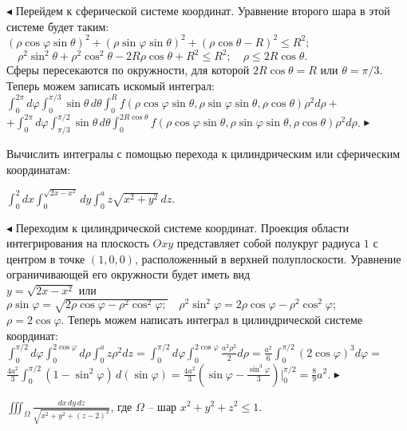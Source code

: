 \documentclass[a5paper,10pt]{article}
\begin{document}
\smallskip
\noindent $\blacktriangleleft$ Перейдем к сферической системе координат. Уравнение второго шара в этой системе будет таким:
$(\rho\cos\varphi\sin\theta)^2+(\rho\sin\varphi\sin\theta)^2+(\rho\cos\theta-R)^2\le R^2;$\\
$\quad\rho^2\sin^2\theta+\rho^2\cos^2\theta-2R\rho\cos\theta+R^2\le R^2;\quad
\rho\le2R\cos\theta.$\\
Сферы пересекаются по окружности, для которой $2R\cos\theta=R$ или $\theta=\pi/3$.\\
Теперь можем записать искомый интеграл:\\
$\displaystyle\int_0^{2\pi}d\varphi\int_0^{\pi/3}\sin\theta\,d\theta\int_0^Rf(\rho\cos\varphi\sin\theta,
\rho\sin\varphi\sin\theta,\rho\cos\theta)\rho^2d\rho+$\\
$\displaystyle +\int_0^{2\pi}d\varphi\int_{\pi/3}^{\pi/2}\sin\theta\,d\theta
\int_0^{2R\cos\theta}f(\rho\cos\varphi\sin\theta,
\rho\sin\varphi\sin\theta,\rho\cos\theta)\rho^2d\rho$. $\blacktriangleright$ 

\medskip
\noindent Вычислить интегралы с помощью перехода к цилиндрическим или сферическим координатам:

\medskip
{} $\displaystyle\int_0^2dx\int_0^{\sqrt{2x-x^2}}dy\int_0^az\sqrt{x^2+y^2}\,dz$.

\smallskip
\noindent $\blacktriangleleft$ Переходим к цилиндрической системе координат. Проекция области
интегрирования на плоскость $Oxy$ представляет собой полукруг радиуса $1$
с центром в точке $(1,0,0)$, расположенный в верхней полуплоскости.
Уравнение ограничивающей его окружности будет иметь вид\\
$y=\sqrt{2x-x^2}$ или $\rho\sin\varphi=\sqrt{2\rho\cos\varphi-\rho^2\cos^2\varphi;}\quad
\rho^2\sin^2\varphi=2\rho\cos\varphi-\rho^2\cos^2\varphi;$\\
$\rho=2\cos\varphi$. Теперь можем написать интеграл в цилиндрической системе координат:\\
$\displaystyle\int_0^{\pi/2}d\varphi\int_0^{2\cos\varphi}d\rho\int_0^az\rho^2dz=
\int_0^{\pi/2}d\varphi\int_0^{2\cos\varphi}\frac{a^2\rho^2}{2}d\rho=
\frac{a^2}{6}\int_0^{\pi/2}(2\cos\varphi)^3d\varphi=$\\
$\displaystyle\frac{4a^2}{3}\int_0^{\pi/2}(1-\sin^2\varphi)\,d(\sin\varphi)=
\frac{4a^2}{3}\left(\sin\varphi-\frac{\sin^3\varphi}{3}\right)\Big|_0^{\pi/2}=\frac89a^2$.
$\blacktriangleright$

\medskip
{} $\displaystyle\iiint_\Omega\frac{dx\,dy\,dz}{\sqrt{x^2+y^2+(z-2)^2}}$,
где $\Omega$ -- шар $x^2+y^2+z^2\le1$.
\end{document}
